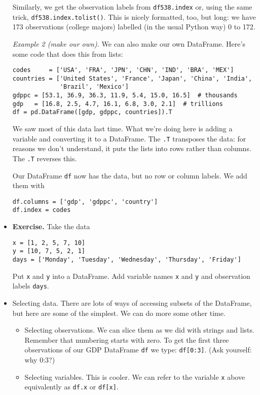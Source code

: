 \documentclass[11pt]{article}
\begin{document}
\begin{itemize}
Similarly, we get the observation labels from
{\tt df538.index} or, using the same trick, {\tt df538.index.tolist()}.
This is nicely formatted, too, but long:  we have 173 observations (college majors)
labelled (in the usual Python way) 0 to 172.


{\it Example 2 (make our own).\/}
We can also make our own DataFrame.  Here's some code that does this from lists:
\begin{verbatim}
codes     = ['USA', 'FRA', 'JPN', 'CHN', 'IND', 'BRA', 'MEX']
countries = ['United States', 'France', 'Japan', 'China', 'India',
             'Brazil', 'Mexico']
gdppc = [53.1, 36.9, 36.3, 11.9, 5.4, 15.0, 16.5]  # thousands
gdp   = [16.8, 2.5, 4.7, 16.1, 6.8, 3.0, 2.1]  # trillions
df = pd.DataFrame([gdp, gdppc, countries]).T
\end{verbatim}
We saw most of this data last time.
What we're doing here is adding a variable and converting it to a DataFrame.
The {\tt .T} transposes the data:  for reasons we don't understand,
it puts the lists into rows rather than columns.
The {\tt .T} reverses this.

Our DataFrame {\tt df} now has the data, but no row or column labels.
We add them with
\begin{verbatim}
df.columns = ['gdp', 'gdppc', 'country']
df.index = codes
\end{verbatim}

\item {\bf Exercise.}
Take the data
\begin{verbatim}
x = [1, 2, 5, 7, 10]
y = [10, 7, 5, 2, 1]
days = ['Monday', 'Tuesday', 'Wednesday', 'Thursday', 'Friday']
\end{verbatim}
Put {\tt x} and {\tt y} into a DataFrame.
Add variable names {\tt x} and {\tt y} and observation labels {\tt days}.


\item Selecting data.
There are lots of ways of accessing subsets of the DataFrame,
but here are some of the simplest.
We can do more some other time.
\begin{itemize}
\item Selecting observations.  We can slice them as we did with strings
and lists.  Remember that numbering starts with zero.
To get the first three observations of our GDP DataFrame {\tt df} we type:
{\tt df[0:3]}.
(Ask yourself:  why 0:3?)

\item Selecting variables.  This is cooler.
We can refer to the variable {\tt x} above equivalently as
{\tt df.x} or {\tt df[x]}.


\end{itemize}
\end{itemize}
\end{document}

